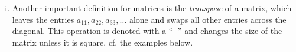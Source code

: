 \begin{remark}
\begin{enumerate}[(i)]
\[\begin{array}{c>{\columncolor{olive!20}}ccc}
\end{array} \right]
= \left[ \begin{array}{cccc}
c_{11} & \cellcolor{olive!20} c_{12} & \cdots & c_{1k} \\
c_{21} & c_{22} & \cdots & c_{2k} \\
\vdots & \vdots & \ddots & \vdots \\
c_{m1} & c_{m2} & \cdots & c_{mk} \\
\end{array} \right]. \]
	\item Another important definition for matrices is the \emph{transpose} of a matrix, which leaves the entries $a_{11}, a_{22}, a_{33}, \dots$ alone and swaps all other entries across the diagonal. This operation is denoted with a ``$^\top$'' and changes the size of the matrix unless it is square, cf. the examples below.
\end{enumerate}	
\end{remark}

